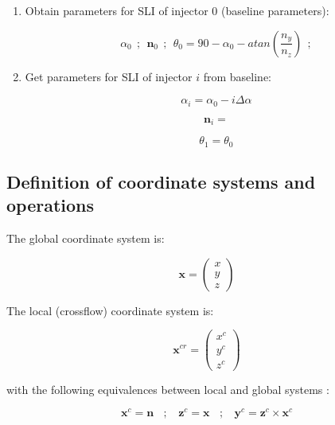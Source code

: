\begin{enumerate}

	\item Obtain parameters for SLI of injector 0 (baseline parameters):
	
	\begin{equation}
	\alpha_0  ~~ ; ~~ \boldsymbol{n}_0 ~~ ; ~~ \theta_0 = 90 - \alpha_0 - atan \left( \frac{n_y}{n_z} \right) ~~ ; 
	\end{equation}

	\item Get parameters for SLI of injector $i$ from baseline:
	
	\begin{equation}
	\alpha_i = \alpha_0 - i \Delta \alpha 
	\end{equation}
	
	\begin{equation}
	\boldsymbol{n}_i = 
	\end{equation}
	
	\begin{equation}
	\theta_1 = \theta_0
	\end{equation}
	

\end{enumerate}

\subsection{Definition of coordinate systems and operations}

The global coordinate system is:

\begin{equation}
\boldsymbol{x} =  \begin{pmatrix} x \\ y \\ z \end{pmatrix}
\end{equation}

The local (crossflow) coordinate system is:

\begin{equation}
\boldsymbol{x}^{cr} = \begin{pmatrix} x^c \\ y^c \\ z^c \end{pmatrix}
\end{equation}

with the following equivalences between local and global systems :

\begin{equation}
\boldsymbol{x}^c = \boldsymbol{n}  ~~~~ ; ~~~~ \boldsymbol{z}^c = \boldsymbol{x}  ~~~~ ; ~~~~ \boldsymbol{y}^c =  \boldsymbol{z}^c \times \boldsymbol{x}^c
\end{equation}

